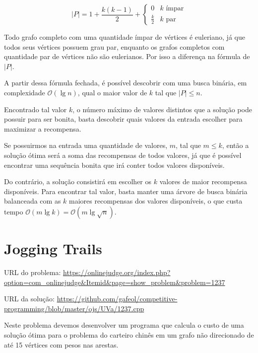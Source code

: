         
        \[ |P|
             =  1 + \frac{k(k-1)}{2} + 
            \begin{cases} 
                0 & k \text{ ímpar} \\
                \frac{k}{2} & k \text{ par}
            \end{cases}
        \]

        Todo grafo completo com uma quantidade ímpar de vértices é euleriano, já que todos seus vértices possuem grau par, enquanto os grafos completos com quantidade par de vértices não são eulerianos. 
        Por isso a diferença na fórmula de $|P|$.

        A partir dessa fórmula fechada, é possível descobrir com uma busca binária, em complexidade $\mathcal{O}(\lg{n})$, qual o maior valor de $k$ tal que $|P| \leq n$.

        Encontrado tal valor $k$, o número máximo de valores distintos que a solução pode possuir para ser bonita, basta descobrir quais valores da entrada escolher para maximizar a recompensa.
        

        Se possuirmos na entrada uma quantidade de valores, $m$, tal que $m \leq k$, então a solução ótima será a soma das recompensas de todos valores, já que é possível encontrar uma sequência bonita que irá conter todos valores disponíveis.

        Do contrário, a solução consistirá em escolher os $k$ valores de maior recompensa disponíveis.
    Para encontrar tal valor, basta manter uma árvore de busca binária balanceada com as $k$ maiores recompensas dos valores disponíveis, o que custa tempo $\mathcal{O}(m\lg k) = \mathcal{O}(m\lg \sqrt{n})$.

        \section{Jogging Trails}

        \hspace{.55cm} URL do problema: \href{https://onlinejudge.org/index.php?option=com_onlinejudge&Itemid=8&page=show_problem&problem=1237}{https://onlinejudge.org/index.php?option=\-com\_\-onli\-ne\-judge\-\&Itemid\&page=show\_problem\&problem=1237}

        URL da solução: \href{https://github.com/gafeol/competitive-programming/blob/master/ojs/UVa/1237.cpp}{https://github.com/gafeol/\-compe\-titive-program\-ming\-/blob/master/ojs/UVa/1237.cpp}
        
        Neste problema devemos desenvolver um programa que calcula o custo de uma solução ótima para o problema do carteiro chinês em um grafo não direcionado de até 15 vértices com pesos nas arestas.

